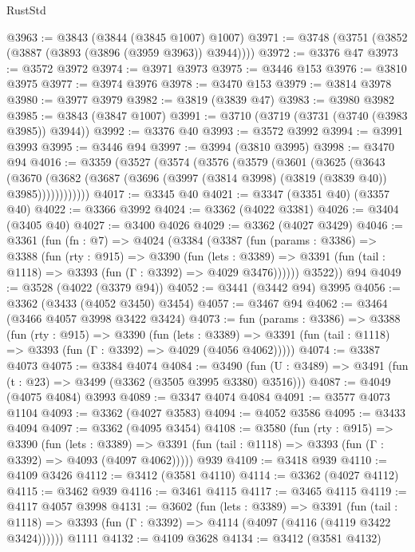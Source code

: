 \begin{lexlean}{RustStd}
\begin{coremodule}
{\begin{coremodule}
{{{{{{{{{{{{{{{{{{{{{{{{{{{{{{{@3963 := @3843 (@3844 (@3845 @1007) @1007)
@3971 := @3748 (@3751 (@3852 (@3887 (@3893 (@3896 (@3959 @3963)) @3944))))
@3972 := @3376 @47
@3973 := @3572 @3972
@3974 := @3971 @3973
@3975 := @3446 @153
@3976 := @3810 @3975
@3977 := @3974 @3976
@3978 := @3470 @153
@3979 := @3814 @3978
@3980 := @3977 @3979
@3982 := @3819 (@3839 @47)
@3983 := @3980 @3982
@3985 := @3843 (@3847 @1007)
@3991 := @3710 (@3719 (@3731 (@3740 (@3983 @3985)) @3944))
@3992 := @3376 @40
@3993 := @3572 @3992
@3994 := @3991 @3993
@3995 := @3446 @94
@3997 := @3994 (@3810 @3995)
@3998 := @3470 @94
@4016 := @3359
    (@3527
      (@3574
        (@3576
          (@3579
            (@3601
              (@3625
                (@3643
                  (@3670
                    (@3682 (@3687 (@3696 (@3997 (@3814 @3998) (@3819 (@3839 @40)) @3985))))))))))))
@4017 := @3345 @40
@4021 := @3347 (@3351 @40) (@3357 @40)
@4022 := @3366 @3992
@4024 := @3362 (@4022 @3381)
@4026 := @3404 (@3405 @40)
@4027 := @3400 @4026
@4029 := @3362 (@4027 @3429)
@4046 := @3361
    (fun (fn : @7) =>
    @4024
      (@3384
        (@3387
          (fun (params : @3386) =>
          @3388
            (fun (rty : @915) =>
            @3390
              (fun (lets : @3389) =>
              @3391 (fun (tail : @1118) => @3393 (fun (Γ : @3392) => @4029 @3476))))))
        @3522))
    @94
@4049 := @3528 (@4022 (@3379 @94))
@4052 := @3441 (@3442 @94) @3995
@4056 := @3362 (@3433 (@4052 @3450) @3454)
@4057 := @3467 @94
@4062 := @3464 (@3466 @4057 @3998 @3422 @3424)
@4073 := fun (params : @3386) =>
  @3388
    (fun (rty : @915) =>
    @3390
      (fun (lets : @3389) =>
      @3391 (fun (tail : @1118) => @3393 (fun (Γ : @3392) => @4029 (@4056 @4062)))))
@4074 := @3387 @4073
@4075 := @3384 @4074
@4084 := @3490 (fun (U : @3489) => @3491 (fun (t : @23) => @3499 (@3362 (@3505 @3995 @3380) @3516)))
@4087 := @4049 (@4075 @4084) @3993
@4089 := @3347 @4074 @4084
@4091 := @3577 @4073 @1104
@4093 := @3362 (@4027 @3583)
@4094 := @4052 @3586
@4095 := @3433 @4094
@4097 := @3362 (@4095 @3454)
@4108 := @3580
    (fun (rty : @915) =>
    @3390
      (fun (lets : @3389) =>
      @3391 (fun (tail : @1118) => @3393 (fun (Γ : @3392) => @4093 (@4097 @4062)))))
    @939
@4109 := @3418 @939
@4110 := @4109 @3426
@4112 := @3412 (@3581 @4110)
@4114 := @3362 (@4027 @4112)
@4115 := @3462 @939
@4116 := @3461 @4115
@4117 := @3465 @4115
@4119 := @4117 @4057 @3998
@4131 := @3602
    (fun (lets : @3389) =>
    @3391
      (fun (tail : @1118) => @3393 (fun (Γ : @3392) => @4114 (@4097 (@4116 (@4119 @3422 @3424))))))
    @1111
@4132 := @4109 @3628
@4134 := @3412 (@3581 @4132)
}}}}}}}}}}}}}}}}}}}}}}}}}}}}}}}
\end{coremodule}}
\end{coremodule}
\end{lexlean}
